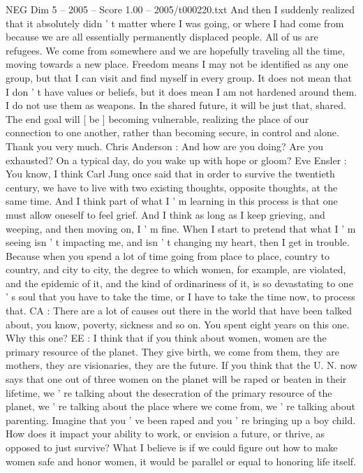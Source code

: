 \begin{textsample}{NEG Dim 5 – 2005 – Score 1.00 – 2005/t000220.txt}
And then I suddenly realized that it absolutely didn ' t matter where I was going, or where I had come from because we are all essentially permanently displaced people.
All of us are refugees.
We come from somewhere and we are hopefully traveling all the time, moving towards a new place.
Freedom means I may not be identified as any one group, but that I can visit and find myself in every group.
It does not mean that I don ' t have values or beliefs, but it does mean I am not hardened around them.
I do not use them as weapons.
In the shared future, it will be just that, shared.
The end goal will [ be ] becoming vulnerable, realizing the place of our connection to one another, rather than becoming secure, in control and alone.
Thank you very much.
Chris Anderson : And how are you doing?
Are you exhausted?
On a typical day, do you wake up with hope or gloom?
Eve Ensler : You know, I think Carl Jung once said that in order to survive the twentieth century, we have to live with two existing thoughts, opposite thoughts, at the same time.
And I think part of what I ' m learning in this process is that one must allow oneself to feel grief.
And I think as long as I keep grieving, and weeping, and then moving on, I ' m fine.
When I start to pretend that what I ' m seeing isn ' t impacting me, and isn ' t changing my heart, then I get in trouble.
Because when you spend a lot of time going from place to place, country to country, and city to city, the degree to which women, for example, are violated, and the epidemic of it, and the kind of ordinariness of it, is so devastating to one ' s soul that you have to take the time, or I have to take the time now, to process that.
CA : There are a lot of causes out there in the world that have been talked about, you know, poverty, sickness and so on.
You spent eight years on this one.
Why this one?
EE : I think that if you think about women, women are the primary resource of the planet.
They give birth, we come from them, they are mothers, they are visionaries, they are the future.
If you think that the U.
N. now says that one out of three women on the planet will be raped or beaten in their lifetime, we ' re talking about the desecration of the primary resource of the planet, we ' re talking about the place where we come from, we ' re talking about parenting.
Imagine that you ' ve been raped and you ' re bringing up a boy child.
How does it impact your ability to work, or envision a future, or thrive, as opposed to just survive?
What I believe is if we could figure out how to make women safe and honor women, it would be parallel or equal to honoring life itself.

\end{textsample}
